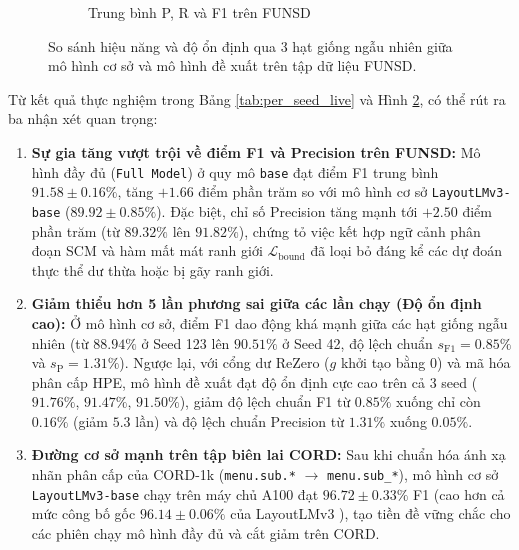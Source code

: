 \begin{figure}[!htb]
\begin{subfigure}{0.49\textwidth}
        \caption{Trung bình P, R và F1 trên FUNSD}
        \label{fig:funsd_metrics_b}
    \end{subfigure}
    \caption{So sánh hiệu năng và độ ổn định qua 3 hạt giống ngẫu nhiên giữa mô hình cơ sở và mô hình đề xuất trên tập dữ liệu FUNSD.}
    \label{fig:funsd_seed_comparison}
\end{figure}

Từ kết quả thực nghiệm trong Bảng \ref{tab:per_seed_live} và Hình \ref{fig:funsd_seed_comparison}, có thể rút ra ba nhận xét quan trọng:
\begin{enumerate}
    \item \textbf{Sự gia tăng vượt trội về điểm F1 và Precision trên FUNSD:} Mô hình đầy đủ (\texttt{Full Model}) ở quy mô \texttt{base} đạt điểm F1 trung bình $\mathbf{91.58 \pm 0.16\%}$, tăng $\mathbf{+1.66}$ điểm phần trăm so với mô hình cơ sở \texttt{LayoutLMv3-base} ($89.92 \pm 0.85\%$). Đặc biệt, chỉ số Precision tăng mạnh tới $\mathbf{+2.50}$ điểm phần trăm (từ $89.32\%$ lên $91.82\%$), chứng tỏ việc kết hợp ngữ cảnh phân đoạn SCM và hàm mất mát ranh giới $\mathcal{L}_{\text{bound}}$ đã loại bỏ đáng kể các dự đoán thực thể dư thừa hoặc bị gãy ranh giới.
    \item \textbf{Giảm thiểu hơn 5 lần phương sai giữa các lần chạy (Độ ổn định cao):} Ở mô hình cơ sở, điểm F1 dao động khá mạnh giữa các hạt giống ngẫu nhiên (từ $88.94\%$ ở Seed 123 lên $90.51\%$ ở Seed 42, độ lệch chuẩn $s_{\text{F1}} = 0.85\%$ và $s_{\text{P}} = 1.31\%$). Ngược lại, với cổng dư ReZero ($g$ khởi tạo bằng $0$) và mã hóa phân cấp HPE, mô hình đề xuất đạt độ ổn định cực cao trên cả 3 seed ($91.76\%$, $91.47\%$, $91.50\%$), giảm độ lệch chuẩn F1 từ $0.85\%$ xuống chỉ còn $\mathbf{0.16\%}$ (giảm $5.3$ lần) và độ lệch chuẩn Precision từ $1.31\%$ xuống $\mathbf{0.05\%}$.
    \item \textbf{Đường cơ sở mạnh trên tập biên lai CORD:} Sau khi chuẩn hóa ánh xạ nhãn phân cấp của CORD-1k (\texttt{menu.sub.*} $\rightarrow$ \texttt{menu.sub\_*}), mô hình cơ sở \texttt{LayoutLMv3-base} chạy trên máy chủ A100 đạt $96.72 \pm 0.33\%$ F1 (cao hơn cả mức công bố gốc $96.14 \pm 0.06\%$ của LayoutLMv3 \cite{huang2022layoutlmv3}), tạo tiền đề vững chắc cho các phiên chạy mô hình đầy đủ và cắt giảm trên CORD.
\end{enumerate}

